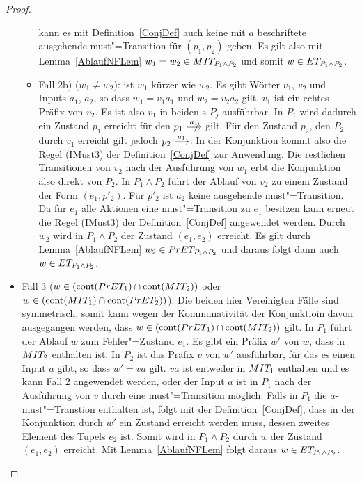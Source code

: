 \begin{proof}
\begin{itemize}
\begin{itemize}
          kann es mit Definition~\ref{ConjDef} auch keine mit $a$ beschriftete
          ausgehende must"=Transition für $(p_1,p_2)$ geben. Es gilt also mit
          Lemma~\ref{AblaufNFLem} $w_1=w_2\in MIT _{P_1\land P_2}$ und somit
          $w\in ET _{P_1\land P_2}$.
        \item Fall 2b) ($w_1\neq w_2$): \OBdA{} ist $w_1$ kürzer wie $w_2$. Es
          gibt Wörter $v_1$, $v_2$ und Inputs $a_1$, $a_2$, so dass $w_1 =
          v_1a_1$ und $w_2 = v_2a_2$ gilt. $v_1$ ist ein echtes Präfix von
          $v_2$. Es ist also $v_1$ in beiden \MEIO{}s $P_j$ ausführbar. In
          $P_1$ wird dadurch ein Zustand $p_1$ erreicht für den
          $p_1\anmust[a_1]$ gilt. Für den Zustand $p_2$, den $P_2$ durch $v_1$
          erreicht gilt jedoch $p_2\must[a_1]$. In der Konjunktion kommt also
          die Regel (IMust3) der Definition~\ref{ConjDef} zur Anwendung. Die
          restlichen Transitionen von $v_2$ nach der Ausführung von $w_1$ erbt
          die Konjunktion also direkt von $P_2$. In $P_1\land P_2$ führt der
          Ablauf von $v_2$ zu einem Zustand der Form $(e_1,p'_2)$. Für $p'_2$
          ist $a_2$ keine ausgehende must"=Transition. Da für $e_1$ alle
          Aktionen eine must"=Transition zu $e_1$ besitzen kann erneut die
          Regel (IMust3) der Definition~\ref{ConjDef} angewendet werden. Durch
          $w_2$ wird in $P_1\land P_2$ der Zustand $(e_1,e_2)$ erreicht. Es
          gilt durch Lemma~\ref{AblaufNFLem} $w_2\in PrET _{P_1\land P_2}$ und
          daraus folgt dann auch $w\in ET _{P_1\land P_2}$.
      \end{itemize}
    \item Fall 3 ($w\in (\mathrm{cont} (PrET _1)\cap \mathrm{cont} (MIT _2))$ oder $w\in
      (\mathrm{cont} (MIT _1)\cap \mathrm{cont} (PrET _2))$): Die beiden hier Vereinigten
      Fälle sind symmetrisch, somit kann wegen der Kommunativität der
      Konjunktioin \oBdA{} davon ausgegangen werden, dass $w\in (\mathrm{cont} (PrET
      _1)\cap \mathrm{cont} (MIT _2))$ gilt. In $P_1$ führt der Ablauf $w$ zum
      Fehler"=Zustand $e_1$. Es gibt ein Präfix $w'$ von $w$, dass in $MIT _2$
      enthalten ist. In $P_2$ ist das Präfix $v$ von $w'$ ausführbar, für das
      es einen Input $a$ gibt, so dass $w'=va$ gilt. $va$ ist entweder in $MIT
      _1$ enthalten und es kann Fall 2 angewendet werden, oder der Input $a$
      ist in $P_1$ nach der Ausführung von $v$ durch eine must"=Transition
      möglich. Falls in $P_1$ die $a$-must"=Transtion enthalten ist, folgt mit
      der Definition~\ref{ConjDef}, dass in der Konjunktion durch $w'$ ein
      Zustand erreicht werden muss, dessen zweites Element des Tupels $e_2$
      ist. Somit wird in $P_1\land P_2$ durch $w$ der Zustand $(e_1,e_2)$
      erreicht. Mit Lemma~\ref{AblaufNFLem} folgt daraus $w\in ET _{P_1\land
      P_2}$.
  \end{itemize}


\end{proof}
